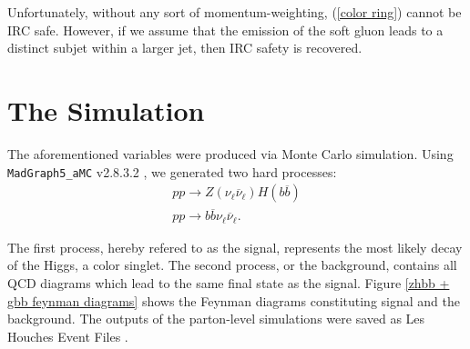 \documentclass[10pt,a4paper]{book}
\def\code#1{\texttt{#1}}
\begin{document}
Unfortunately, without any sort of momentum-weighting, (\ref{color ring}) cannot be IRC safe. However, if we assume that the emission of the soft gluon leads to a distinct subjet within a larger jet, then IRC safety is recovered.

\section{The Simulation}

The aforementioned variables were produced via Monte Carlo simulation. Using \code{MadGraph5\_aMC} v2.8.3.2 \cite{Alwall:2014hca}, we generated two hard processes:
\begin{gather}
p p \rightarrow Z(\nu_\ell \overline{\nu}_\ell) H(b\overline{b}) \\
p p \rightarrow b\overline{b} \nu_\ell \overline{\nu}_\ell.
\end{gather}

The first process, hereby refered to as the signal, represents the most likely decay of the Higgs, a color singlet. The second process, or the background, contains all QCD diagrams which lead to the same final state as the signal. Figure \ref{zhbb + gbb feynman diagrams} shows the Feynman diagrams constituting signal and the background. The outputs of the parton-level simulations were saved as Les Houches Event Files \cite{Alwall:2006yp}.
\end{document}
